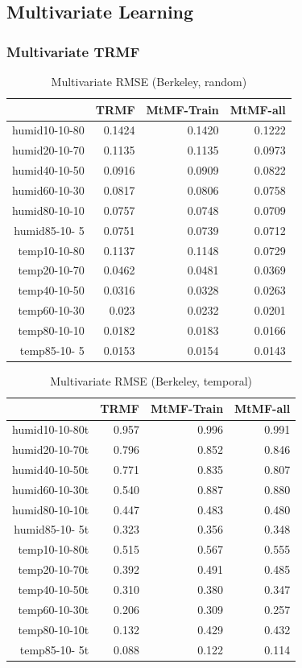 \subsection{Multivariate Learning}
\subsubsection{Multivariate TRMF}

\begin{table}[htbp]
\caption{Multivariate RMSE (Berkeley, random)}
\label{traffic}
\begin{tabular}{r | r r r}
	&TRMF	&MtMF-Train	&MtMF-all \\ \hline
humid10-10-80	&0.1424	&0.1420	&0.1222\\
humid20-10-70	&0.1135	&0.1135	&0.0973\\
humid40-10-50	&0.0916	&0.0909	&0.0822\\
humid60-10-30	&0.0817	&0.0806	&0.0758\\
humid80-10-10	&0.0757	&0.0748	&0.0709\\
humid85-10- 5	&0.0751	&0.0739	&0.0712\\
 temp10-10-80	&0.1137	&0.1148	&0.0729\\
 temp20-10-70	&0.0462	&0.0481	&0.0369\\
 temp40-10-50	&0.0316	&0.0328	&0.0263\\
 temp60-10-30	&0.023	&0.0232	&0.0201\\
 temp80-10-10	&0.0182	&0.0183	&0.0166\\
 temp85-10- 5	&0.0153	&0.0154	&0.0143\\
\end{tabular}
\end{table}


\begin{table}[htbp]
\caption{Multivariate RMSE (Berkeley, temporal)}
\label{traffic}
\begin{tabular}{r | r r r}
	&TRMF	&MtMF-Train	&MtMF-all \\ \hline
humid10-10-80t	&0.957&0.996& 	0.991\\
humid20-10-70t	&0.796&0.852& 	0.846\\
humid40-10-50t	&0.771&0.835& 	0.807\\
humid60-10-30t	&0.540&0.887& 	0.880\\
humid80-10-10t	&0.447&0.483& 	0.480\\
humid85-10- 5t	&0.323&0.356& 	0.348\\
 temp10-10-80t	&0.515&0.567& 	0.555\\
 temp20-10-70t	&0.392&0.491& 	0.485\\
 temp40-10-50t	&0.310&0.380& 	0.347\\
 temp60-10-30t	&0.206&0.309& 	0.257\\
 temp80-10-10t	&0.132&0.429& 	0.432\\
 temp85-10- 5t	&0.088&0.122& 	0.114\\
\end{tabular}
\end{table}

